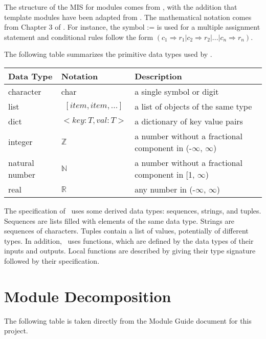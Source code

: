 \documentclass[12pt, titlepage]{article}
\begin{document}
The structure of the MIS for modules comes from \citet{HoffmanAndStrooper1995},
with the addition that template modules have been adapted from
\cite{GhezziEtAl2003}.  The mathematical notation comes from Chapter 3 of
\citet{HoffmanAndStrooper1995}.  For instance, the symbol := is used for a
multiple assignment statement and conditional rules follow the form $(c_1
\Rightarrow r_1 | c_2 \Rightarrow r_2 | ... | c_n \Rightarrow r_n )$.

The following table summarizes the primitive data types used by \progname. 

\begin{center}
\renewcommand{\arraystretch}{1.2}
\noindent 
\begin{tabular}{l l p{7.5cm}} 
\toprule 
\textbf{Data Type} & \textbf{Notation} & \textbf{Description}\\ 
\midrule
character & char & a single symbol or digit\\
list & $$[item, item,...]$$ & a list of objects of the same type\\
dict & $<key: T, val: T>$ & a dictionary of key value pairs\\
integer & $\mathbb{Z}$ & a number without a fractional component in (-$\infty$, $\infty$) \\
natural number & $\mathbb{N}$ & a number without a fractional component in [1, $\infty$) \\
real & $\mathbb{R}$ & any number in (-$\infty$, $\infty$)\\
\bottomrule
\end{tabular} 
\end{center}

\noindent
The specification of \progname \ uses some derived data types: sequences, strings, and
tuples. Sequences are lists filled with elements of the same data type. Strings
are sequences of characters. Tuples contain a list of values, potentially of
different types. In addition, \progname \ uses functions, which
are defined by the data types of their inputs and outputs. Local functions are
described by giving their type signature followed by their specification.

\section{Module Decomposition}

The following table is taken directly from the Module Guide document for this project.
\end{document}
